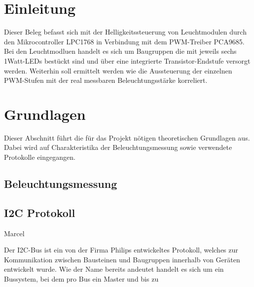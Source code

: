 \documentclass[a4paper,12pt]{scrartcl}
\begin{document}
\tableofcontents
\thispagestyle{empty}

\clearpage

\onehalfspacing

\pagestyle{headings}	%

\clearpage
\listoffigures

\clearpage
\section{Einleitung}
Dieser Beleg befasst sich mit der Helligkeitssteuerung von Leuchtmodulen durch den Mikrocontroller LPC1768 in Verbindung mit dem PWM-Treiber PCA9685. Bei den
Leuchtmodluen handelt es sich um Baugruppen die mit jeweils sechs 1Watt-LEDs best\"uckt sind und \"uber eine integrierte Transistor-Endstufe versorgt werden.  
Weiterhin soll ermittelt werden wie die Aussteuerung der einzelnen PWM-Stufen mit der real messbaren Beleuchtungsst\"arke korreliert. 

\clearpage
\section{Grundlagen}
Dieser Abschnitt führt die für das Projekt nötigen theoretischen Grundlagen aus. Dabei wird auf Charakteristika der Beleuchtungsmessung sowie verwendete Protokolle eingegangen.

\subsection{Beleuchtungsmessung}

\subsection{I2C Protokoll}
Marcel

Der I2C-Bus ist ein von der Firma Philips entwickeltes Protokoll, welches zur Kommunikation zwischen Bausteinen und Baugruppen innerhalb von Ger\"aten entwickelt wurde. Wie der Name bereits andeutet handelt es sich um ein Bussystem, bei dem pro Bus ein Master und bis zu 
\end{document}
